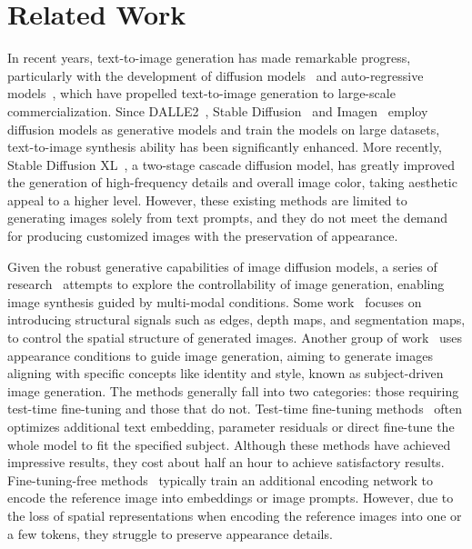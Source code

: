 \section{Related Work}

In recent years, text-to-image generation has made remarkable progress, particularly with the development of diffusion models~\cite{ramesh2022dalle2, nichol2022glide, rombach2022ldm, saharia2022imagen, dhariwal2021diffusionbeatgans, ho2020ddpm, podell2023sdxl, huang2023epidiff} and auto-regressive
models~\cite{chang2023muse, yu2022scalingauto, tian2024var}, which have propelled text-to-image generation to large-scale commercialization. Since DALLE2~\cite{ramesh2022dalle2}, Stable Diffusion~\cite{rombach2022ldm} and Imagen~\cite{saharia2022imagen} employ diffusion models as generative models and train the models on large datasets, text-to-image synthesis ability has been significantly enhanced. More recently, Stable Diffusion XL~\cite{podell2023sdxl}, a two-stage cascade diffusion model, has greatly improved the generation of high-frequency details and overall image color, taking aesthetic appeal to a higher level. However, these existing methods are limited to generating images solely from text prompts, and they do not meet the demand for producing customized images with the preservation of appearance.

Given the robust generative capabilities of image diffusion models, a series of research~\cite{zhang2023controlnet, mou2023t2iadapter, qin2023unicontrol, ruiz2023dreambooth, hu2021lora, ye2023ipadapter, chen2023anydoor, zhang2024ssrencoder} attempts to explore the controllability of image generation, enabling image synthesis guided by multi-modal conditions. Some work~\cite{zhang2023controlnet, mou2023t2iadapter, jiang2023scedit, qin2023unicontrol, zhao2024unicontrolnet, hu2023cocktail} focuses on introducing structural signals such as edges, depth maps, and segmentation maps, to control the spatial structure of generated images. Another group of work~\cite{ruiz2023dreambooth, hu2021lora, gal2022textualinversion, ye2023ipadapter, chen2023anydoor} uses appearance conditions to guide image generation, aiming to generate images aligning with specific concepts like identity and style, known as subject-driven image generation. The methods generally fall into two categories: those requiring test-time fine-tuning and those that do not. Test-time fine-tuning methods~\cite{ruiz2023dreambooth, hu2021lora, gal2022textualinversion, kumari2023customdiffusion, liu2023cones} often optimizes additional text embedding, parameter residuals or direct fine-tune the whole model to fit the specified subject. Although these methods have achieved impressive results, they cost about half an hour to achieve satisfactory results. Fine-tuning-free methods~\cite{shi2023instantbooth, ye2023ipadapter, chen2023anydoor, zhang2024ssrencoder, ma2023subjectdiffusion, gal2023encoderdiff, wei2023elite} typically train an additional encoding network to encode the reference image into embeddings or image prompts. However, due to the loss of spatial representations when encoding the reference images into one or a few tokens, they struggle to preserve appearance details.

